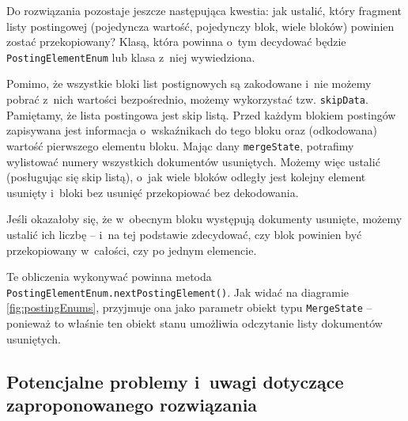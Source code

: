 Do rozwiązania pozostaje jeszcze następująca kwestia: jak ustalić, który fragment listy postingowej (pojedyncza wartość, pojedynczy blok, wiele bloków) powinien zostać przekopiowany? Klasą, która powinna o~tym decydować będzie \texttt{PostingElementEnum} lub klasa z~niej wywiedziona. 

Pomimo, że wszystkie bloki list postignowych są zakodowane i~nie możemy pobrać z~nich wartości bezpośrednio, możemy wykorzystać tzw. \texttt{skipData}. Pamiętamy, że lista postingowa jest skip listą. Przed każdym blokiem postingów zapisywana jest informacja o~wskaźnikach do tego bloku oraz (odkodowana) wartość pierwszego elementu bloku. Mając dany \texttt{mergeState}, potrafimy wylistować numery wszystkich dokumentów usuniętych. Możemy więc ustalić (posługując się skip listą), o~jak wiele bloków odległy jest kolejny element usunięty i~bloki bez usunięć przekopiować bez dekodowania.

Jeśli okazałoby się, że w~obecnym bloku występują dokumenty usunięte, możemy ustalić ich liczbę -- i~na tej podstawie zdecydować, czy blok powinien być przekopiowany w~całości, czy po jednym elemencie. 

Te obliczenia wykonywać powinna metoda \texttt{PostingElementEnum.nextPostingElement()}. Jak widać na diagramie \ref{fig:postingEnums}, przyjmuje ona jako parametr obiekt typu \texttt{MergeState} -- ponieważ to właśnie ten obiekt stanu umożliwia odczytanie listy dokumentów usuniętych.

\subsection{Potencjalne problemy i~uwagi dotyczące zaproponowanego rozwiązania}

